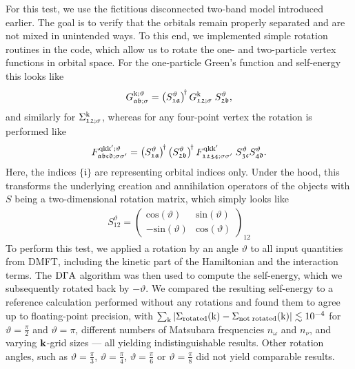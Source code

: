 \documentclass[../../main.tex]{subfiles}
\begin{document}
For this test, we use the fictitious disconnected two-band model introduced earlier. The goal is to verify that the orbitals remain properly separated and are not mixed in unintended ways. To this end, we implemented simple rotation routines in the code, which allow us to rotate the one- and two-particle vertex functions in orbital space. For the one-particle Green's function and self-energy this looks like
\begin{align}
	G_{\mathfrak{ab;\sigma}}^{\text{k};\vartheta}=\left (S^{\vartheta}_{\mathfrak{1a}}\right )^{\!\dagger} G_{\mathfrak{12;\sigma}}^{\text{k}}\; S_{\mathfrak{2b}}^{\vartheta},
\end{align}
and similarly for $\Sigma_{\mathfrak{12};\sigma}^{\text{k}}$, whereas for any four-point vertex the rotation is performed like
\begin{align}
	F_{\mathfrak{abcd;\sigma\sigma'}}^{\text{q}\text{k}\text{k}';\vartheta}=\left( S^{\vartheta}_{\mathfrak{1a}}\right)^{\!\dagger} \left (S^{\vartheta}_{\mathfrak{2b}}\right)^{\!\dagger} F_{\mathfrak{1234};\sigma\sigma'}^{\text{q}\text{k}\text{k}'}\; S_{\mathfrak{3c}}^{\vartheta}S_{\mathfrak{4d}}^{\vartheta}.
\end{align}
Here, the indices $\{\mathfrak{i}\}$ are representing orbital indices only. Under the hood, this transforms the underlying creation and annihilation operators of the objects with $S$ being a two-dimensional rotation matrix, which simply looks like
\begin{align}
	S_{\mathfrak{12}}^{\vartheta} = \begin{pmatrix}
	\text{cos}(\vartheta) & \text{sin}(\vartheta)\\-\text{sin}(\vartheta)&\text{cos}(\vartheta)
	\end{pmatrix}_\mathfrak{12}
\end{align}
To perform this test, we applied a rotation by an angle $\vartheta$ to all input quantities from DMFT, including the kinetic part of the Hamiltonian and the interaction terms. The $\text{D}\Gamma\text{A}$ algorithm was then used to compute the self-energy, which we subsequently rotated back by $-\vartheta$. We compared the resulting self-energy to a reference calculation performed without any rotations and found them to agree up to floating-point precision, with $\sum_{\text{k}}|\Sigma_{\text{rotated}}(\text{k})-\Sigma_{\text{not\;rotated}}(\text{k})|\lesssim 10^{-4}$ for $\vartheta=\frac\pi2$ and $\vartheta=\pi$, different numbers of Matsubara frequencies $n_\omega$ and $n_\nu$​, and varying $\textbf{k}$-grid sizes --- all yielding indistinguishable results. Other rotation angles, such as $\vartheta=\frac\pi3$, $\vartheta=\frac\pi4$, $\vartheta=\frac\pi6$ or $\vartheta=\frac\pi8$ did not yield comparable results.
\end{document}
